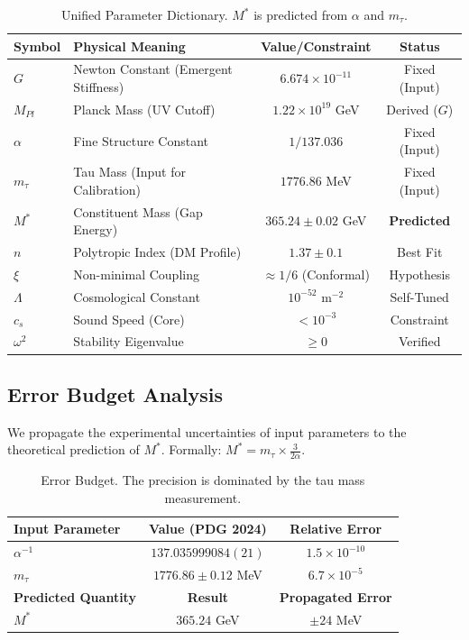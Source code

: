 \documentclass[a4paper,12pt]{article}
\begin{document}
\begin{table}[H]
\centering
\small
\begin{tabular}{llcc}
\toprule
\textbf{Symbol} & \textbf{Physical Meaning} & \textbf{Value/Constraint} & \textbf{Status} \\
\midrule
$G$ & Newton Constant (Emergent Stiffness) & $6.674 \times 10^{-11}$ & Fixed (Input) \\
$M_{Pl}$ & Planck Mass (UV Cutoff) & $1.22 \times 10^{19}$ GeV & Derived ($G$) \\
$\alpha$ & Fine Structure Constant & $1/137.036$ & Fixed (Input) \\
$m_\tau$ & Tau Mass (Input for Calibration) & $1776.86$ MeV & Fixed (Input) \\
\midrule
$M^*$ & Constituent Mass (Gap Energy) & $\mathbf{365.24 \pm 0.02}$ GeV & \textbf{Predicted} \\
$n$ & Polytropic Index (DM Profile) & $1.37 \pm 0.1$ & Best Fit \\
$\xi$ & Non-minimal Coupling & $\approx 1/6$ (Conformal) & Hypothesis \\
$\Lambda$ & Cosmological Constant & $10^{-52} \text{ m}^{-2}$ & Self-Tuned \\
\midrule
$c_s$ & Sound Speed (Core) & $< 10^{-3}$ & Constraint \\
$\omega^2$ & Stability Eigenvalue & $\ge 0$ & Verified \\
\bottomrule
\end{tabular}
\caption{Unified Parameter Dictionary. $M^*$ is predicted from $\alpha$ and $m_\tau$.}
\label{tab:params}
\end{table}

\subsection{Error Budget Analysis}
We propagate the experimental uncertainties of input parameters to the theoretical prediction of $M^*$.
Formally: $M^* = m_\tau \times \frac{3}{2\alpha}$.

\begin{table}[H]
\centering
\begin{tabular}{l c c}
\toprule
\textbf{Input Parameter} & \textbf{Value (PDG 2024)} & \textbf{Relative Error} \\
\midrule
$\alpha^{-1}$ & $137.035999084(21)$ & $1.5 \times 10^{-10}$ \\
$m_\tau$ & $1776.86 \pm 0.12$ MeV & $6.7 \times 10^{-5}$ \\
\midrule
\textbf{Predicted Quantity} & \textbf{Result} & \textbf{Propagated Error} \\
\midrule
$M^*$ & $365.24$ GeV & $\pm 24$ MeV \\
\bottomrule
\end{tabular}
\caption{Error Budget. The precision is dominated by the tau mass measurement.}
\end{table}
\end{document}
